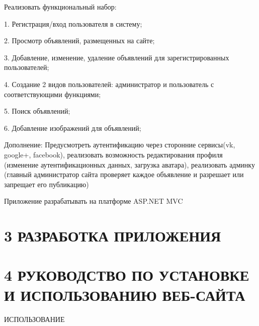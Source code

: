 \documentclass[14pt,a4paper]{extreport}
\begin{document}
	\hspace{4ex}Реализовать функциональный набор:

	\hspace{4ex}1. Регистрация/вход пользователя в систему;

	\hspace{4ex}2. Просмотр объявлений, размещенных на сайте;

	\hspace{4ex}3. Добавление, изменение, удаление объявлений для зарегистрированных пользователей;

	\hspace{4ex}4. Создание 2 видов пользователей: администратор и  пользователь с соответствующими функциями;

	\hspace{4ex}5. Поиск объявлений;

	\hspace{4ex}6. Добавление изображений для объявлений;\par
          	\hspace{4ex} Дополнение: Предусмотреть аутентификацию через сторонние сервисы(vk, google+, facebook),  реализовать возможность редактирования профиля (изменение аутентификационных данных, загрузка аватара), реализовать админку (главный администратор сайта проверяет каждое объявление и разрешает или запрещает его публикацию) \par 
	 Приложение разрабатывать на платформе ASP.NET MVC\par

	\newpage
	\section*{\normalsize\hspace{4ex}3 РАЗРАБОТКА ПРИЛОЖЕНИЯ}

	\newpage
	\section*{\normalsize\hspace{4ex}4 РУКОВОДСТВО ПО УСТАНОВКЕ И ИСПОЛЬЗОВАНИЮ ВЕБ-САЙТА}
	\hspace{4ex}ИСПОЛЬЗОВАНИЕ
	\newpage
\end{document}
